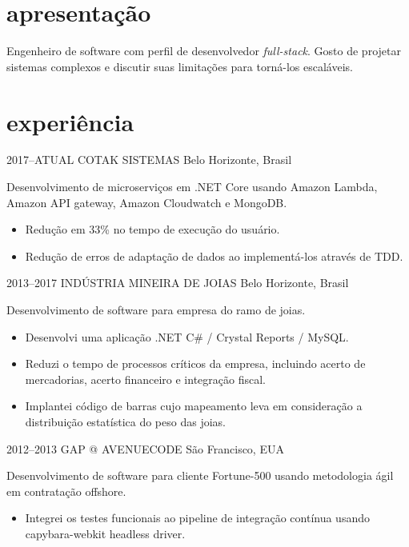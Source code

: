 \documentclass[]{friggeri-cv}
\begin{document}
\section{apresentação}

Engenheiro de software com perfil de desenvolvedor \textit{full-stack}. Gosto de projetar sistemas complexos e discutir suas limitações para torná-los escaláveis.

\section{experiência}

\begin{entrylist}

\entry
{2017--ATUAL}
{COTAK SISTEMAS}
{Belo Horizonte, Brasil}
{ Desenvolvimento de microserviços em .NET Core usando Amazon Lambda, Amazon API gateway, Amazon Cloudwatch e MongoDB.
	
	\begin{itemize}
		\item Redução em 33\% no tempo de execução do usuário.
		\item Redução de erros de adaptação de dados ao implementá-los através de TDD.
	\end{itemize}
}

\entry
{2013--2017}
{INDÚSTRIA MINEIRA DE JOIAS}
{Belo Horizonte, Brasil}
{ Desenvolvimento de software para empresa do ramo de joias.

  \begin{itemize}
    \item Desenvolvi uma aplicação .NET C\# / Crystal Reports / MySQL.
    \item Reduzi o tempo de processos críticos da empresa, incluindo acerto de mercadorias, acerto financeiro e integração fiscal.
    \item Implantei código de barras cujo mapeamento leva em consideração a distribuição estatística do peso das joias.
  \end{itemize}
  }

\entry
{2012--2013}
{GAP @ AVENUECODE}
{São Francisco, EUA}
{ Desenvolvimento de software para cliente Fortune-500 usando metodologia ágil em contratação offshore.
  \begin{itemize}
    \item Integrei os testes funcionais ao pipeline de integração contínua usando capybara-webkit headless driver.
  \end{itemize}
}



\end{entrylist}
\end{document}
